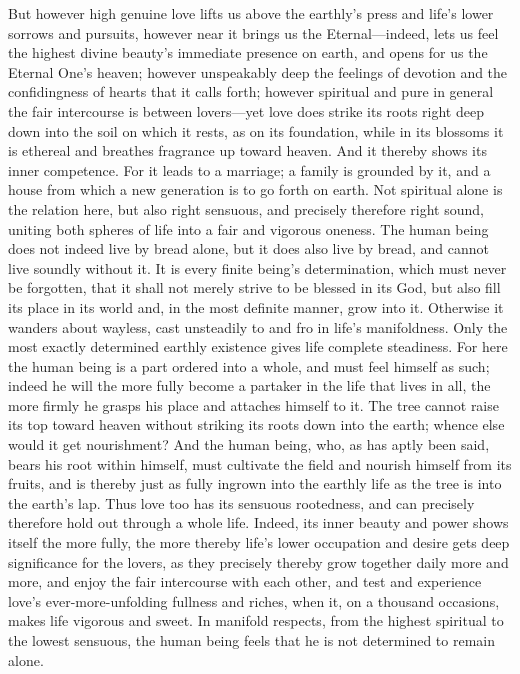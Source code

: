 \documentclass[12pt,a4paper]{book}
\begin{document}
But however high genuine love lifts us above the earthly's press and life's
lower sorrows and pursuits, however near it brings us the Eternal---indeed,
lets us feel the highest divine beauty's immediate presence on earth, and
opens for us the Eternal One's heaven; however unspeakably deep the
feelings of devotion and the confidingness of hearts that it calls forth;
however spiritual and pure in general the fair intercourse is between
lovers---yet love does strike its roots right deep down into the soil on
which it rests, as on its foundation, while in its blossoms it is ethereal
and breathes fragrance up toward heaven. And it thereby shows its inner competence. For it leads to a marriage; a
family is grounded by it, and a house from which a new generation is to go
forth on earth. Not spiritual alone is the relation here, but also right
sensuous, and precisely therefore right sound, uniting both spheres of life
into a fair and vigorous oneness. The human being does not indeed live by
bread alone, but it does also live by bread, and cannot live soundly
without it. It is every finite being's determination, which must never be
forgotten, that it shall not merely strive to be blessed in its God, but
also fill its place in its world and, in the most definite manner, grow
into it. Otherwise it wanders about wayless, cast unsteadily to and fro in
life's manifoldness. Only the most exactly determined earthly existence
gives life complete steadiness. For here the human being is a part ordered
into a whole, and must feel himself as such; indeed he will the more fully
become a partaker in the life that lives in all, the more firmly he grasps
his place and attaches himself to it. The tree cannot raise its top toward
heaven without striking its roots down into the earth; whence else would it
get nourishment? And the human being, who, as has aptly been said, bears
his root within himself, must cultivate the field and nourish himself from
its fruits, and is thereby just as fully ingrown into the earthly life as
the tree is into the earth's lap. Thus love too has its sensuous
rootedness, and can precisely therefore hold out through a whole life.
Indeed, its inner beauty and power shows itself the more fully, the more
thereby life's lower occupation and desire gets deep significance for the
lovers, as they precisely thereby grow together daily more and more, and
enjoy the fair intercourse with each other, and test and experience love's
ever-more-unfolding fullness and riches, when it, on a thousand occasions,
makes life vigorous and sweet. In manifold respects, from the highest
spiritual to the lowest sensuous, the human being feels that he is not
determined to remain alone.
\end{document}
